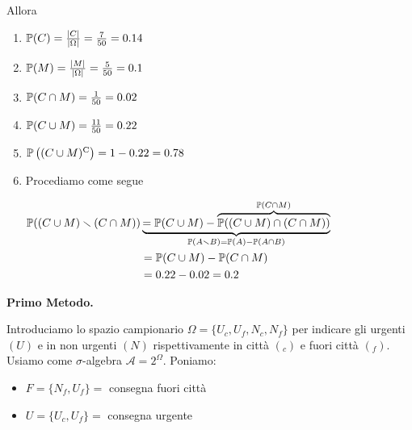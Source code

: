 \begin{enumerate}
Allora
\begin{enumerate}
\item $\P( C) =\frac{| C| }{| \Omega | } =\frac{7}{50} =0.14$
\item $\P( M) =\frac{| M| }{| \Omega | } =\frac{5}{50} =0.1$
\item $\P( C\cap M) =\frac{1}{50} =0.02$
\item $\P( C\cup M) =\frac{11}{50} =0.22$
\item $\P\left(( C\cup M)\comp\right) =1-0.22=0.78$
\item Procediamo come segue

$\begin{aligned}
\P(( C\cup M) \smallsetminus ( C\cap M)) & \underbrace{=\P( C\cup M) -\overbrace{\P(( C\cup M) \cap ( C\cap M))}^{\P( C\cap M)}}_{\P( A\smallsetminus B) =\P( A) -\P( A\cap B)}\\
 & =\P( C\cup M) -\P( C\cap M)\\
 & =0.22-0.02=0.2
\end{aligned}$
\end{enumerate}
\end{enumerate}
\Soluzione

\textbf{Primo Metodo.}

Introduciamo lo spazio campionario $\Omega =\{U_{c} ,U_{f} ,N_{c} ,N_{f}\}$ per indicare gli urgenti $( U)$ e in non urgenti $( N)$ rispettivamente in città $(_{c})$ e fuori città $(_{f})$. Usiamo come $\sigma $-algebra $\mathcal{A} =2^{\Omega }$. Poniamo:
\begin{itemize}
\item $F=\{N_{f} ,U_{f}\} =$ consegna fuori città
\item $U=\{U_{c} ,U_{f}\} =$ consegna urgente
\end{itemize}

